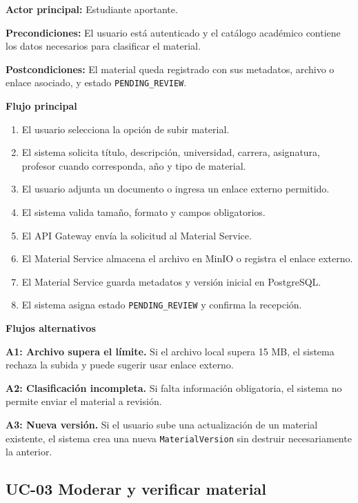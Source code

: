 \documentclass[12pt,a4paper]{article}
\begin{document}
\noindent\textbf{Actor principal:} Estudiante aportante.

\noindent\textbf{Precondiciones:} El usuario está autenticado y el catálogo académico contiene los datos necesarios para clasificar el material.

\noindent\textbf{Postcondiciones:} El material queda registrado con sus metadatos, archivo o enlace asociado, y estado \texttt{PENDING\_REVIEW}.

\noindent\textbf{Flujo principal}

\begin{enumerate}
    \item El usuario selecciona la opción de subir material.
    \item El sistema solicita título, descripción, universidad, carrera, asignatura, profesor cuando corresponda, año y tipo de material.
    \item El usuario adjunta un documento o ingresa un enlace externo permitido.
    \item El sistema valida tamaño, formato y campos obligatorios.
    \item El API Gateway envía la solicitud al Material Service.
    \item El Material Service almacena el archivo en MinIO o registra el enlace externo.
    \item El Material Service guarda metadatos y versión inicial en PostgreSQL.
    \item El sistema asigna estado \texttt{PENDING\_REVIEW} y confirma la recepción.
\end{enumerate}

\noindent\textbf{Flujos alternativos}

\noindent\textbf{A1: Archivo supera el límite.} Si el archivo local supera 15 MB, el sistema rechaza la subida y puede sugerir usar enlace externo.

\noindent\textbf{A2: Clasificación incompleta.} Si falta información obligatoria, el sistema no permite enviar el material a revisión.

\noindent\textbf{A3: Nueva versión.} Si el usuario sube una actualización de un material existente, el sistema crea una nueva \texttt{MaterialVersion} sin destruir necesariamente la anterior.

\subsection{UC-03 Moderar y verificar material}
\end{document}
